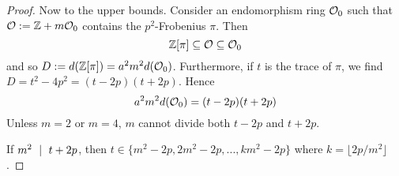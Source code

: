 \begin{proof}
    Now to the upper bounds.
    Consider an endomorphism ring $\mathcal{O}_0$ such that $\mathcal{O} := \mathbb{Z} + m\mathcal{O}_0$ contains the $p^2$-Frobenius $\pi$.
    Then
    \begin{equation*}
        \mathbb{Z}[\pi] \subseteq \mathcal{O} \subseteq \mathcal{O}_0
    \end{equation*}
    and so $D := d(\mathbb{Z}[\pi]) = a^2m^2d(\mathcal{O}_0)$.
    Furthermore, if $t$ is the trace of $\pi$, we find $D = t^2 - 4p^2 = (t - 2p)(t + 2p)$.
    Hence
    \begin{equation*}
        a^2m^2d(\mathcal{O}_0) = (t - 2p)(t + 2p)
    \end{equation*}
    Unless $m = 2$ or $m = 4$, $m$ cannot divide both $t - 2p$ and $t + 2p$.

    If $m^2 \ \mid \  t + 2p$, then $t \in \{ m^2 - 2p, 2m^2 - 2p, ..., km^2 - 2p \}$ where $k = \lfloor 2p/m^2 \rfloor$.


\end{proof}
